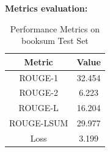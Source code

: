 \hfill \break
\textbf{Metrics evaluation:} 

\begin{table}[h!]
    \centering
    \begin{tabular}{|c|c|}
        \hline
        \textbf{Metric} & \textbf{Value} \\
        \hline
        ROUGE-1 & 32.454 \\
        \hline
        ROUGE-2 & 6.223 \\
        \hline
        ROUGE-L & 16.204 \\
        \hline
        ROUGE-LSUM & 29.977 \\
        \hline
        Loss & 3.199 \\
        \hline
    \end{tabular}
    \caption{Performance Metrics on booksum Test Set}
    \label{tab:performance_metrics}
\end{table}


